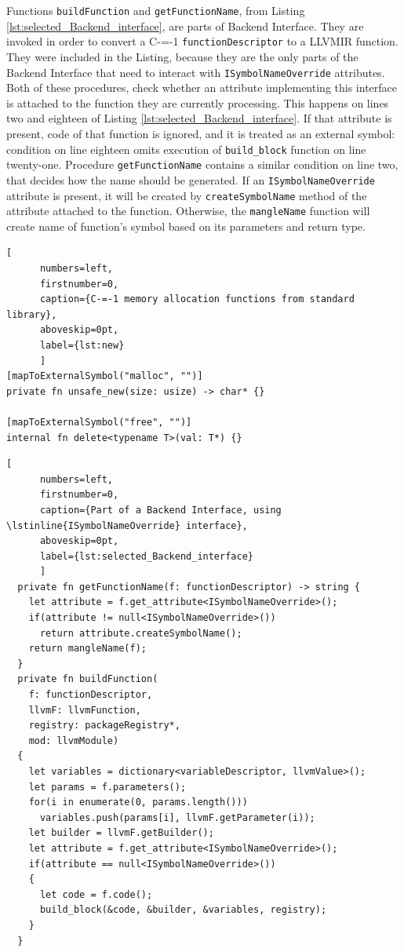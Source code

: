 Functions \lstinline{buildFunction} and \lstinline{getFunctionName}, from Listing \ref{lst:selected_Backend_interface}, are parts of Backend Interface.
They are invoked in order to convert a C-=-1 \lstinline{functionDescriptor} to a LLVMIR function.
They were included in the Listing, because they are the only parts of the Backend Interface that need to interact with \lstinline{ISymbolNameOverride} attributes.
Both of these procedures, check whether an attribute implementing this interface is attached to the function they are currently processing.
This happens on lines two and eighteen of Listing \ref{lst:selected_Backend_interface}.
If that attribute is present, code of that function is ignored, and it is treated as an external symbol: condition on line eighteen omits execution of \lstinline{build_block} function on line twenty-one.
Procedure \lstinline{getFunctionName} contains a similar condition on line two, that decides how the name should be generated.
If an \lstinline{ISymbolNameOverride} attribute is present, it will be created by \lstinline{createSymbolName} method of the attribute attached to the function.
Otherwise, the \lstinline{mangleName} function will create name of function's symbol based on its parameters and return type.

\begin{minipage}{\linewidth}

	\begin{lstlisting}[
	  numbers=left,
	  firstnumber=0,
	  caption={C-=-1 memory allocation functions from standard library},
	  aboveskip=0pt,
	  label={lst:new}
	  ]
[mapToExternalSymbol("malloc", "")]
private fn unsafe_new(size: usize) -> char* {}

[mapToExternalSymbol("free", "")]
internal fn delete<typename T>(val: T*) {}

  \end{lstlisting}
\end{minipage}


\begin{minipage}{\linewidth}

	\begin{lstlisting}[
	  numbers=left,
	  firstnumber=0,
	  caption={Part of a Backend Interface, using \lstinline{ISymbolNameOverride} interface},
	  aboveskip=0pt,
	  label={lst:selected_Backend_interface}
	  ]
  private fn getFunctionName(f: functionDescriptor) -> string {
	let attribute = f.get_attribute<ISymbolNameOverride>();
	if(attribute != null<ISymbolNameOverride>())
	  return attribute.createSymbolName();
	return mangleName(f);
  }
  private fn buildFunction(
	f: functionDescriptor,
	llvmF: llvmFunction,
	registry: packageRegistry*,
	mod: llvmModule)
  {
	let variables = dictionary<variableDescriptor, llvmValue>();
	let params = f.parameters();
	for(i in enumerate(0, params.length()))
	  variables.push(params[i], llvmF.getParameter(i));
	let builder = llvmF.getBuilder();
	let attribute = f.get_attribute<ISymbolNameOverride>();
	if(attribute == null<ISymbolNameOverride>())
	{
	  let code = f.code();
	  build_block(&code, &builder, &variables, registry);
	}
  }
  \end{lstlisting}
\end{minipage}


